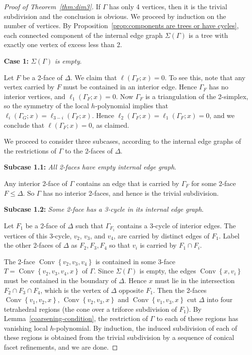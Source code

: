 \documentclass[10pt]{amsart}
\DeclareMathOperator{\Convop}{Conv}
\newcommand{\Conv}[1]{\Convop\left\{{#1}\right\}}
\newenvironment{proofsection}[2]{\par\smallskip\noindent\textbf{#1} \emph{#2}.\par\nobreak}{\par\smallskip}
\begin{document}
\begin{proof}[Proof of Theorem~\ref{thm:dim3}]
If $\Gamma$ has only 4 vertices, then it is the trivial subdivision and the conclusion is obvious. We proceed by induction on the number of vertices. By Proposition~\ref{prop:components are trees or have cycles}, each connected component of the internal edge graph $\Sigma(\Gamma)$ is a tree with exactly one vertex of excess less than 2. 

\begin{proofsection}{Case 1:}{$\Sigma(\Gamma)$ is empty}

Let $F$ be a 2-face of $\Delta$. We claim that $\ell(\Gamma_F;x) = 0$. To see this, note that any vertex carried by $F$ must be contained in an interior edge. Hence $\Gamma_F$ has no interior vertices, and $\ell_1(\Gamma_F;x) = 0$. Now $\Gamma_F$ is a triangulation of the 2-simplex, so the symmetry of the local $h$-polynomial implies that $\ell_i(\Gamma_G;x) = \ell_{3-i}(\Gamma_F;x)$. Hence $\ell_2(\Gamma_F;x) = \ell_1(\Gamma_F;x) = 0$, and we conclude that $\ell(\Gamma_F;x) = 0$, as claimed.


We proceed to consider three subcases, according to the internal edge graphs of the restrictions of $\Gamma$ to the 2-faces of $\Delta$.
\end{proofsection}

\begin{proofsection}{Subcase 1.1:}{All 2-faces have empty internal edge graph}

Any interior 2-face of $\Gamma$ contains an edge that is carried by $\Gamma_F$ for some 2-face $F \leq \Delta$. So $\Gamma$ has no interior 2-faces, and hence is the trivial subdivision. 
\end{proofsection}

\begin{proofsection}{Subcase 1.2:}{Some 2-face has a 3-cycle in its internal edge graph}

Let $F_1$ be a 2-face of $\Delta$ such that $\Gamma_{F_1}$ contains a 3-cycle of interior edges. 
The vertices of this 3-cycle, $v_2$, $v_3$, and 
$v_4$, are carried by distinct edges of $F_1$.
Label the other 2-faces of $\Delta$ as $F_2,F_3,F_4$ so that $v_i$ is carried by $F_1\cap F_i$. 

The 2-face $\Conv{v_2,v_3,v_4}$ is contained in some 3-face $T=\Conv{v_2,v_3,v_4,x}$ of $\Gamma$. Since $\Sigma(\Gamma)$
is empty, the edges $\Conv{x,v_i}$ must be contained in the boundary of $\Delta$. Hence $x$ must lie in the intersection $F_2\cap F_3\cap F_4$, which is the vertex of $\Delta$ opposite $F_1$. Then the 2-faces $\Conv{v_1,v_2,x}$, 
$\Conv{v_2,v_3,x}$ and $\Conv{v_1,v_3,x}$ cut $\Delta$ into four tetrahedral regions (the cone over a triforce subdivision of $F_1$). By Lemma~\ref{coarsening-condition}, the restriction of $\Gamma$ to each of these regions has vanishing local $h$-polynomial. By induction, the induced subdivision of each of these regions is obtained from the trivial subdivision by a sequence of conical facet refinements, and we are done.
\end{proofsection}


\end{proof}
\end{document}

